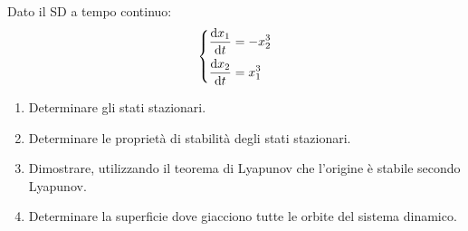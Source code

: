 \begin{ex}[]
    Dato il SD a tempo continuo:
    \[
    \begin{dcases}
    \frac{\text{d} x_1}{\text{d} t} = -x_2^3\\
    \frac{\text{d} x_2}{\text{d} t} = x_1^3
    \end{dcases}
    \]
    \begin{enumerate}
        \item Determinare gli stati stazionari.
	\item Determinare le proprietà di stabilità degli stati stazionari.
	\item Dimostrare, utilizzando il teorema di Lyapunov che l'origine è stabile secondo Lyapunov.
	\item Determinare la superficie dove giacciono tutte le orbite del sistema dinamico.
    \end{enumerate}
\end{ex}
\noindent
